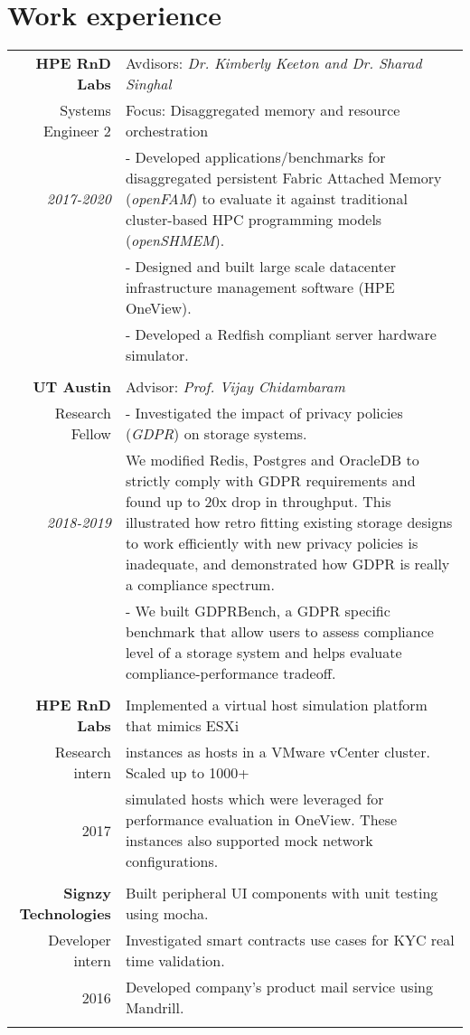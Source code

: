 \documentclass[a4paper,10pt]{article}
\begin{document}
\section{Work experience}
\begin{tabular}{r|p{11cm}}
\textbf{HPE RnD Labs} & Avdisors: \emph{Dr. Kimberly Keeton and Dr. Sharad Singhal} \\ Systems Engineer 2 & Focus: Disaggregated memory and resource orchestration \\\emph{2017-2020}&- Developed applications/benchmarks for disaggregated persistent Fabric Attached Memory (\emph{openFAM}) to evaluate it against traditional cluster-based HPC programming models (\emph{openSHMEM}). \\ & - Designed and built large scale datacenter infrastructure management software (HPE OneView).\\& - Developed a Redfish compliant server hardware simulator. \\\multicolumn{2}{c}{}\\

\textbf{UT Austin} & Advisor: \emph{Prof. Vijay Chidambaram} \\
Research Fellow & - Investigated the impact of privacy policies (\emph{GDPR}) on storage systems. \\\emph{2018-2019} & We modified Redis, Postgres and OracleDB to strictly comply with GDPR requirements and found up to 20x drop in throughput. This illustrated how retro fitting existing storage designs to work efficiently with new privacy policies is inadequate, and demonstrated how GDPR is really a compliance spectrum.\\ & - We built GDPRBench, a GDPR specific benchmark that allow users to assess compliance level of a storage system and helps evaluate compliance-performance tradeoff.\\\multicolumn{2}{c}{}\\

\textbf{HPE RnD Labs} & Implemented a virtual host simulation platform that mimics ESXi \\ Research intern & instances as hosts in a VMware vCenter cluster. Scaled up to 1000+ \\2017 & simulated hosts which were leveraged for performance evaluation in OneView. These instances also supported mock network configurations. \\\multicolumn{2}{c}{}\\

\textbf{Signzy Technologies} & Built peripheral UI components with unit testing using mocha. \\ Developer intern & Investigated smart contracts use cases for KYC real time validation. \\2016& Developed company’s product mail service using Mandrill. \\\multicolumn{2}{c}{}\\


\end{tabular}
\end{document}

